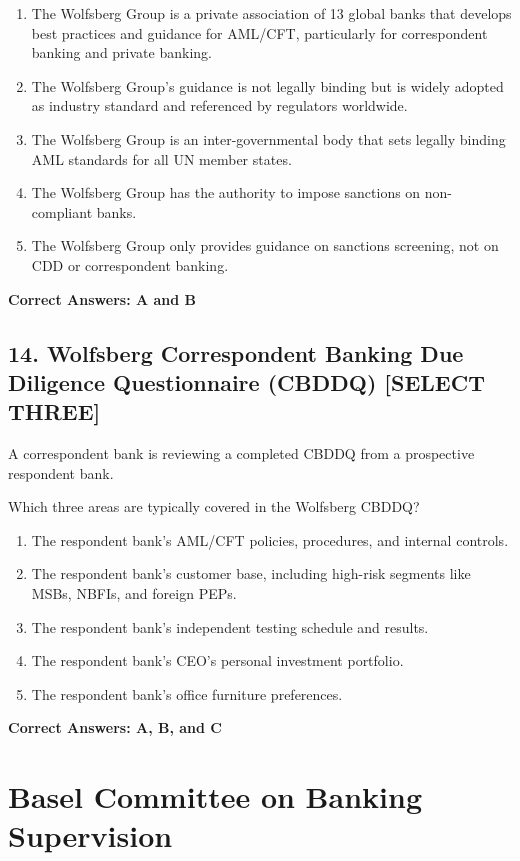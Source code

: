 \documentclass[11pt,a4paper]{article}
\begin{document}
	\begin{enumerate}[label=\Alph*.]
		\item The Wolfsberg Group is a private association of 13 global banks that develops best practices and guidance for AML/CFT, particularly for correspondent banking and private banking.
		\item The Wolfsberg Group's guidance is not legally binding but is widely adopted as industry standard and referenced by regulators worldwide.
		\item The Wolfsberg Group is an inter-governmental body that sets legally binding AML standards for all UN member states.
		\item The Wolfsberg Group has the authority to impose sanctions on non-compliant banks.
		\item The Wolfsberg Group only provides guidance on sanctions screening, not on CDD or correspondent banking.
	\end{enumerate}
	
	\textbf{Correct Answers: A and B}
	
	\subsection{14. Wolfsberg Correspondent Banking Due Diligence Questionnaire (CBDDQ) \textnormal{[SELECT THREE]}}
	
	A correspondent bank is reviewing a completed CBDDQ from a prospective respondent bank.
	
	Which three areas are typically covered in the Wolfsberg CBDDQ?
	
	\begin{enumerate}[label=\Alph*.]
		\item The respondent bank's AML/CFT policies, procedures, and internal controls.
		\item The respondent bank's customer base, including high-risk segments like MSBs, NBFIs, and foreign PEPs.
		\item The respondent bank's independent testing schedule and results.
		\item The respondent bank's CEO's personal investment portfolio.
		\item The respondent bank's office furniture preferences.
	\end{enumerate}
	
	\textbf{Correct Answers: A, B, and C}
	
	\section{Basel Committee on Banking Supervision}
	
\end{document}
